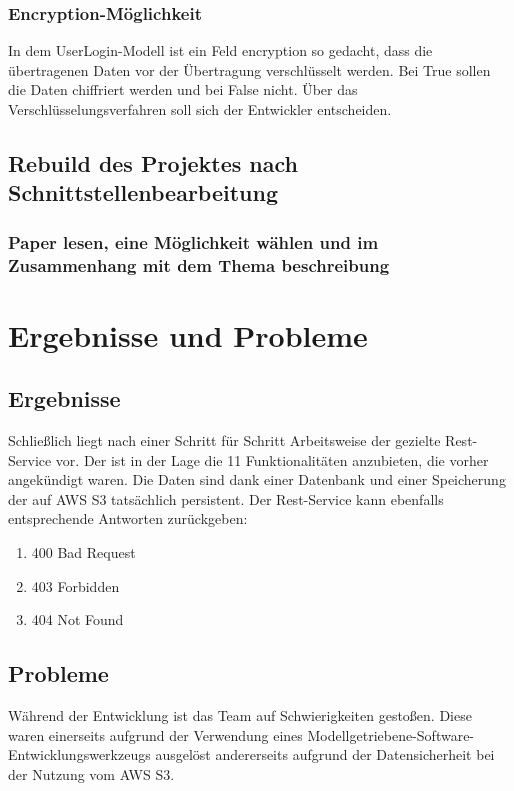\documentclass[a4paper,twoside]{article}
\begin{document}
		\subsubsection{Encryption-M\"oglichkeit}
		In dem UserLogin-Modell ist ein Feld encryption so gedacht, dass die \"ubertragenen Daten vor der \"Ubertragung verschl\"usselt werden. Bei True sollen die Daten chiffriert werden und bei False nicht. \"Uber das Verschl\"usselungsverfahren soll sich der Entwickler entscheiden.
		
	\subsection{Rebuild des Projektes nach Schnittstellenbearbeitung}
		
		\subsubsection{Paper lesen, eine M\"oglichkeit w\"ahlen und im Zusammenhang mit dem Thema beschreibung}

\section{Ergebnisse und Probleme}

	\subsection{Ergebnisse}
	
		Schlie\ss{}lich liegt nach einer Schritt f\"ur Schritt Arbeitsweise der gezielte Rest-Service vor. Der ist in der Lage die 11 Funktionalit\"aten anzubieten, die vorher angek\"undigt waren. Die Daten sind dank einer Datenbank und einer Speicherung der auf AWS S3 tats\"achlich persistent. Der Rest-Service kann ebenfalls entsprechende Antworten zur\"uckgeben:
		\begin{enumerate}
			\item 400 Bad Request
			\item 403 Forbidden
			\item 404 Not Found
		\end{enumerate}
	
	\subsection{Probleme}
		
		W\"ahrend der Entwicklung ist das Team auf Schwierigkeiten gesto\ss{}en. Diese waren einerseits aufgrund der Verwendung eines Modellgetriebene-Software-Entwicklungswerkzeugs ausgel\"ost andererseits aufgrund der Datensicherheit bei der Nutzung vom AWS S3.
		
\end{document}
